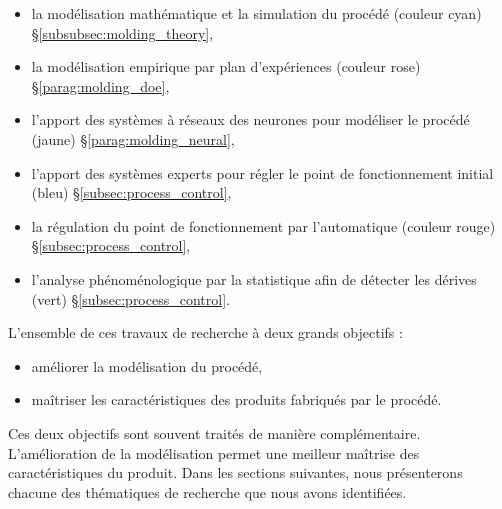 \begin{itemize}
	\item la modélisation mathématique et la simulation du procédé (couleur cyan) §\ref{subsubsec:molding_theory},
	\item la modélisation empirique par plan d'expériences (couleur rose) §\ref{parag:molding_doe},
	\item l’apport des systèmes à réseaux des neurones pour modéliser le procédé (jaune) §\ref{parag:molding_neural},
	\item l’apport des systèmes experts pour régler le point de fonctionnement initial (bleu) §\ref{subsec:process_control},
	\item la régulation du point de fonctionnement par l'automatique (couleur rouge) §\ref{subsec:process_control},
	\item l’analyse phénoménologique par la statistique afin de détecter les dérives (vert) §\ref{subsec:process_control}.
\end{itemize}

\noindent
L'ensemble de ces travaux de recherche à deux grands objectifs :
\begin{itemize}
	\item améliorer la modélisation du procédé,
	\item maîtriser les caractéristiques des produits fabriqués par le procédé.
\end{itemize}
Ces deux objectifs sont souvent traités de manière complémentaire.
L'amélioration de la modélisation permet une meilleur maîtrise des caractéristiques du produit.
Dans les sections suivantes, nous présenterons chacune des thématiques de recherche que nous avons identifiées.

